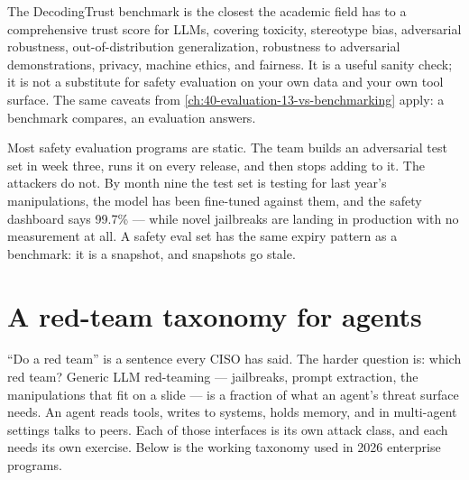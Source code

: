 The DecodingTrust benchmark \citep{wang2023decodingtrust} is the closest the academic field has to a comprehensive trust score for LLMs, covering toxicity, stereotype bias, adversarial robustness, out-of-distribution generalization, robustness to adversarial demonstrations, privacy, machine ethics, and fairness. It is a useful sanity check; it is not a substitute for safety evaluation on your own data and your own tool surface. The same caveats from \autoref{ch:40-evaluation-13-vs-benchmarking} apply: a benchmark compares, an evaluation answers.

\begin{TNwarning}
Most safety evaluation programs are static. The team builds an adversarial test set in week three, runs it on every release, and then stops adding to it. The attackers do not. By month nine the test set is testing for last year's manipulations, the model has been fine-tuned against them, and the safety dashboard says 99.7\% --- while novel jailbreaks are landing in production with no measurement at all. A safety eval set has the same expiry pattern as a benchmark: it is a snapshot, and snapshots go stale.
\end{TNwarning}

\section{A red-team taxonomy for agents}

``Do a red team'' is a sentence every CISO has said. The harder question is: which red team? Generic LLM red-teaming --- jailbreaks, prompt extraction, the manipulations that fit on a slide --- is a fraction of what an agent's threat surface needs. An agent reads tools, writes to systems, holds memory, and in multi-agent settings talks to peers. Each of those interfaces is its own attack class, and each needs its own exercise. Below is the working taxonomy used in 2026 enterprise programs.


